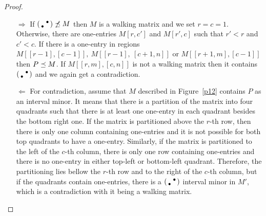 \begin{proof}
\begin{itemize}
\item[$\Rightarrow$] If $\left(\begin{smallmatrix} &\bullet\\\bullet& \end{smallmatrix}\right)\not\preceq M$ then $M$ is a walking matrix and we set $r=c=1$. Otherwise, there are one-entries $M[r,c']$ and $M[r',c]$ such that $r'<r$ and $c'<c$. If there is a one-entry in regions $M[[r-1],[c-1]],\ M[[r-1],\ [c+1,n]]$ or $M[[r+1,m],[c-1]]$ then $P\preceq M$. If $M[[r,m],[c,n]]$ is not a walking matrix then it contains $\left(\begin{smallmatrix} &\bullet\\\bullet& \end{smallmatrix}\right)$ and we again get a contradiction.
\item[$\Leftarrow$] For contradiction, assume that $M$ described in Figure~\ref{p12} contains $P$ as an interval minor. It means that there is a partition of the matrix into four quadrants such that there is at least one one-entry in each quadrant besides the bottom right one. If the matrix is partitioned above the $r$-th row, then there is only one column containing one-entries and it is not possible for both top quadrants to have a one-entry. Similarly, if the matrix is partitioned to the left of the $c$-th column, there is only one row containing one-entries and there is no one-entry in either top-left or bottom-left quadrant. Therefore, the partitioning lies bellow the $r$-th row and to the right of the $c$-th column, but if the quadrants contain one-entries, there is a $\left(\begin{smallmatrix} &\bullet\\\bullet& \end{smallmatrix}\right)$ interval minor in $M'$, which is a contradiction with it being a walking matrix. %
\end{itemize}
\end{proof}

